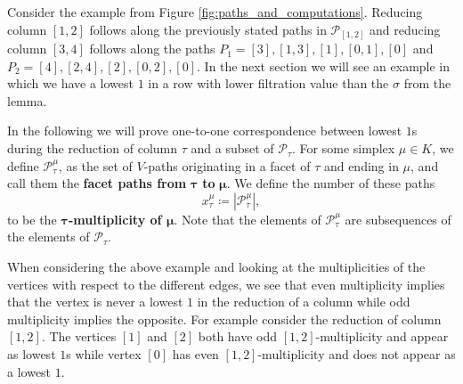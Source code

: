 Consider the example from Figure \ref{fig:paths_and_computations}. Reducing column $[1,2]$ follows along the previously stated paths in  $\mathcal{P}_{[1,2]}$ and reducing column $[3,4]$ follows along the paths $P_1 = [3],[1,3],[1],[0,1],[0]$ and $P_2 = [4],[2,4],[2],[0,2],[0]$. In the next section we will see an example in which we have a lowest $1$ in a row with lower filtration value than the $\sigma$ from the lemma. 

In the following we will prove one-to-one correspondence between lowest $1$s during the reduction of column $\tau$ and a subset of $\mathcal{P}_\tau$. For some simplex $\mu \in K$, we define $\mathcal{P}_\tau^\mu$, as the set of $V$-paths originating in a facet of $\tau$ and ending in $\mu$, and call them the \textbf{facet paths from} $\bm{\tau}$ \textbf{to} $\bm{\mu}$. We define the number of these paths \[
x_\tau^\mu \coloneqq |\mathcal{P}_\tau^\mu|,
\]
to be the \textbf{$\bm{\tau}$-multiplicity of $\bm{\mu}$}. Note that the elements of $\mathcal{P}_\tau^\mu$ are subsequences of the elements of $\mathcal{P}_\tau$. 

When considering the above example and looking at the multiplicities of the vertices with respect to the different edges, we see that even multiplicity implies that the vertex is never a lowest $1$ in the reduction of a column while odd multiplicity implies the opposite. For example consider the reduction of column $[1,2]$. The vertices $[1]$ and $[2]$ both have odd $[1,2]$-multiplicity and appear as lowest $1$s while vertex $[0]$ has even $[1,2]$-multiplicity and does not appear as a lowest $1$.

